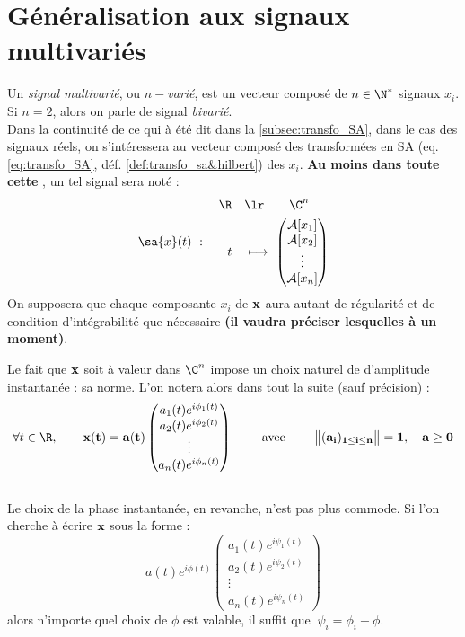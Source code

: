 \section{Généralisation aux signaux multivariés}\label{sec:sign_multivar}

\begin{definition}\label{def:signal_multivar}
	Un \emph{signal multivarié}, ou \emph{$n-$varié}, est un vecteur composé de $n\in\N^*$ signaux $x_i$. Si $n=2$, alors on parle de signal \emph{bivarié}.
	\\
	Dans la continuité de ce qui à été dit dans la \cref{subsec:transfo_SA}, dans le cas des signaux réels, on s'intéressera au vecteur composé des transformées en SA (eq. \ref{eq:transfo_SA}, déf. \ref{def:transfo_sa&hilbert}) des $x_i$.
	\textbf{Au moins dans toute cette }, un tel signal sera noté :
	\[\sa{x}(t)\ :\quad \begin{aligned} 
		\R\quad &\lr\qquad \C^n \\t\quad &\longmapsto\ \begin{pmatrix} \mathcal{A}[x_1] \\ 
			\mathcal{A}[x_2] \\ \vdots \\ \mathcal{A}[x_n] \end{pmatrix}
	\end{aligned} \]
	On supposera que chaque composante $x_i$ de $\bf{x}$ aura autant de régularité et de condition d'intégrabilité que nécessaire \textbf{(il vaudra préciser lesquelles à un moment)}.
\end{definition}

Le fait que $\bf{x}$ soit à valeur dans $\C^n$ impose un choix naturel de d'amplitude instantanée : sa norme. L'on notera alors dans tout la suite (sauf précision) :
\[\forall t\in\R,\qquad 
	\bf{x}(t) = a(t)\begin{pmatrix} a_1(t)e^{i\phi_1(t)} \\ a_2(t)e^{i\phi_2(t)} \\ \vdots \\ a_n(t)e^{i\phi_n(t)}
\end{pmatrix} \qquad\text{ avec }\qquad \big\|(a_i)_{1\leq i\leq n}\big\|=1,\quad a\geq 0
\]
\\
Le choix de la phase instantanée, en revanche, n'est pas plus commode. Si l'on cherche à écrire $\bf{x}$ sous la forme :
\[a(t)e^{i\phi(t)}\begin{pmatrix} a_1(t)e^{i\psi_1(t)} \\ a_2(t)e^{i\psi_2(t)} \\ \vdots \\ a_n(t)e^{i\psi_n(t)}
\end{pmatrix}\]
alors n'importe quel choix de $\phi$ est valable, il suffit que $\ \psi_i = \phi_i-\phi$.



